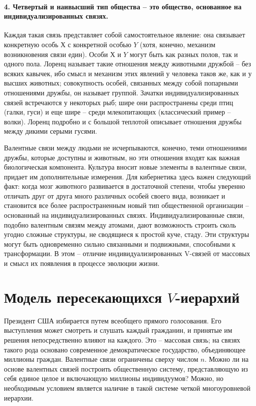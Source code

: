 \documentclass{book}
\begin{document}
\paragraph{4. Четвертый и наивысший тип общества -- это общество, основанное на индивидуализированных связях.} Каждая такая связь представляет собой самостоятельное явление: она связывает конкретную особь $Х$  с конкретной особью $Y$  (хотя, конечно, механизм возникновения связи един). Особи $Х$  и $Y$  могут быть как разных полов, так и одного пола. Лоренц называет такие отношения между животными дружбой -- без всяких кавычек, ибо смысл и механизм этих явлений у человека таков же, как и у высших животных; совокупность особей, связан­ных между собой попарными отношениями дружбы, он называет группой.  Зачатки индивидуализированных связей встречаются у некоторых рыб; шире они распространены среди птиц (галки, гуси) и еще шире -- среди млекопитающих (классический пример -- волки). Лоренц подробно и с большой теплотой описывает отношения дружбы между дикими серыми гусями.

Валентные связи между людьми не исчерпываются, конеч­но, теми отношениями дружбы, которые доступны и животным, но эти отношения входят как важная биологическая компонен­та. Культура вносит новые элементы в валентные связи, при­дает им дополнительные измерения. Для кибернетика здесь ва­жен следующий факт: когда мозг животного развивается в до­статочной степени, чтобы уверенно отличать друг от друга много различных особей своего вида, возникает и становится все бо­лее распространенным новый тип общественной организации -- основанный на индивидуализированных связях. Индивидуали­зированные связи, подобно валентным связям между атомами, дают возможность строить сколь угодно сложные структуры, не сводящиеся к простой куче, стаду. Эти структуры могут быть одновременно сильно связанными и подвижными, способ­ными к трансформации. В этом -- отличие индивидуализирован­ных V-связей  от массовых и смысл их появления в процессе эволюции жизни.


\section{Модель пересекающихся $V$-иерархий}

Президент США избирается путем всеобщего прямого голо­сования. Его выступления может смотреть и слушать каждый гражданин, и принятые им решения непосредственно влияют на каждого. Это -- массовая связь; на связях такого рода осно­вано современное демократическое государство, объединяющее миллионы граждан. Валентные связи ограничены сверху числом $n$.  Можно ли на основе валентных связей построить общест­венную систему, представляющую из себя единое целое и вклю­чающую миллионы индивидуумов? Можно, но необходимым условием является наличие в такой системе четкой многоуров­невой иерархии.
\end{document}
